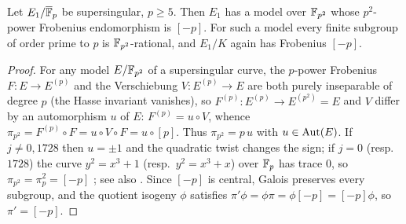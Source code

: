 \begin{lemma}\label{lem:deuring}
Let $E_1/\overline{\mathbb F}_p$ be supersingular, $p\ge5$. Then $E_1$ has a model over $\mathbb F_{p^2}$ whose $p^2$-power
Frobenius endomorphism is $[-p]$. For such a model every finite subgroup of order prime to $p$ is
$\mathbb F_{p^2}$-rational, and $E_1/K$ again has Frobenius $[-p]$.
\end{lemma}
\begin{proof}
For any model $E/\mathbb F_{p^2}$ of a supersingular curve, the $p$-power Frobenius $F:E\to E^{(p)}$ and the
Verschiebung $V:E^{(p)}\to E$ are both purely inseparable of degree $p$ (the Hasse invariant
vanishes), so $F^{(p)}:E^{(p)}\to E^{(p^2)}=E$ and $V$ differ by an automorphism $u$ of $E$:
$F^{(p)}=u\circ V$, whence $\pi_{p^2}=F^{(p)}\circ F=u\circ V\circ F=u\circ[p]$. Thus
$\pi_{p^2}=p\,u$ with $u\in\operatorname{Aut}(E)$. If $j\ne0,1728$ then $u=\pm1$ and the quadratic twist changes
the sign; if $j=0$ (resp.\ $1728$) the curve $y^2=x^3+1$ (resp.\ $y^2=x^3+x$) over $\mathbb F_p$ has
trace $0$, so $\pi_{p^2}=\pi_p^2=[-p]$ \citep{Deuring41,Waterhouse69}; see also
\citet[Lemma~4.3]{Ono25}. Since $[-p]$ is central, Galois preserves every subgroup, and the quotient
isogeny $\phi$ satisfies $\pi'\phi=\phi\pi=\phi[-p]=[-p]\phi$, so $\pi'=[-p]$.
\end{proof}

